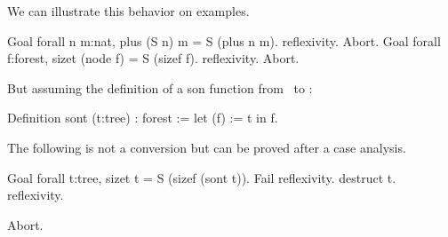 We can illustrate this behavior on examples.
\begin{coq_example}
Goal forall n m:nat, plus (S n) m = S (plus n m).
reflexivity.
Abort.
Goal forall f:forest, sizet (node f) = S (sizef f).
reflexivity.
Abort.
\end{coq_example}
But assuming the definition of a son function from \tree\ to \forest:
\begin{coq_example}
Definition sont (t:tree) : forest 
   := let (f) := t in f.
\end{coq_example}
The following is not a conversion but can be proved after a case analysis.
\begin{coq_example}
Goal forall t:tree, sizet t = S (sizef (sont t)).
Fail reflexivity.
destruct t.
reflexivity.
\end{coq_example}
\begin{coq_eval}
Abort.
\end{coq_eval}



